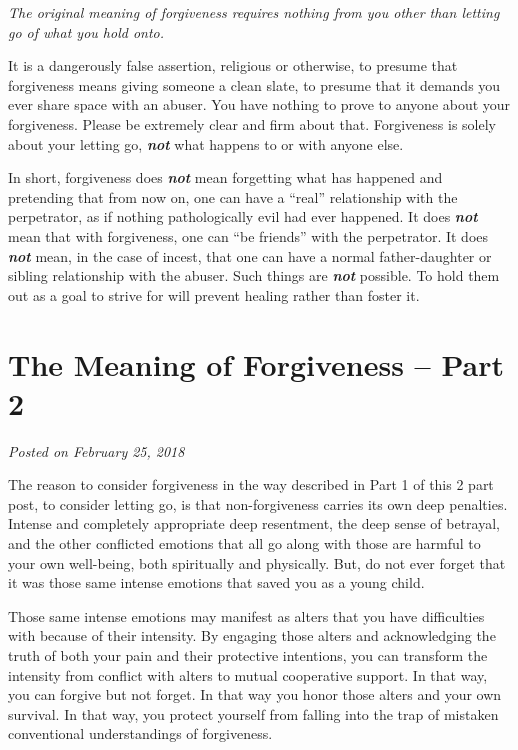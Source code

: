 \documentclass[]{book}
\begin{document}
\emph{The original meaning of forgiveness requires nothing from you other than letting go of what you hold onto.}

It is a dangerously false assertion, religious or otherwise, to presume that forgiveness means giving someone a clean slate, to presume that it demands you ever share space with an abuser. You have nothing to prove to anyone about your forgiveness. Please be extremely clear and firm about that. Forgiveness is solely about your letting go, \textbf{\emph{not}} what happens to or with anyone else.

In short, forgiveness does \textbf{\emph{not}} mean forgetting what has happened and pretending that from now on, one can have a ``real'' relationship with the perpetrator, as if nothing pathologically evil had ever happened. It does \textbf{\emph{not}} mean that with forgiveness, one can ``be friends'' with the perpetrator. It does \textbf{\emph{not}} mean, in the case of incest, that one can have a normal father-daughter or sibling relationship with the abuser. Such things are \textbf{\emph{not}} possible. To hold them out as a goal to strive for will prevent healing rather than foster it.

\hypertarget{the-meaning-of-forgiveness-part-2}{%
\section{The Meaning of Forgiveness -- Part 2}\label{the-meaning-of-forgiveness-part-2}}

\emph{Posted on February 25, 2018}

The reason to consider forgiveness in the way described in Part 1 of this 2 part post, to consider letting go, is that non-forgiveness carries its own deep penalties. Intense and completely appropriate deep resentment, the deep sense of betrayal, and the other conflicted emotions that all go along with those are harmful to your own well-being, both spiritually and physically. But, do not ever forget that it was those same intense emotions that saved you as a young child.

Those same intense emotions may manifest as alters that you have difficulties with because of their intensity. By engaging those alters and acknowledging the truth of both your pain and their protective intentions, you can transform the intensity from conflict with alters to mutual cooperative support. In that way, you can forgive but not forget. In that way you honor those alters and your own survival. In that way, you protect yourself from falling into the trap of mistaken conventional understandings of forgiveness.
\end{document}
